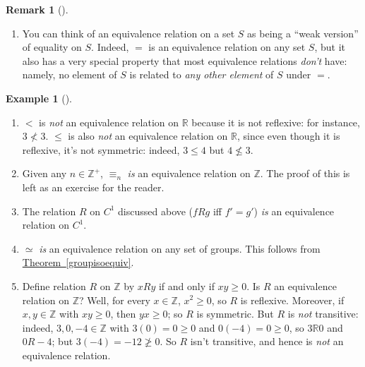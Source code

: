 \documentclass[10pt,]{book}
\theoremstyle{plain}
\theoremstyle{definition}
\theoremstyle{definition}
\newtheorem{remark}[theorem]{Remark}
\theoremstyle{definition}
\newtheorem{example}[theorem]{Example}
\theoremstyle{definition}
\numberwithin{equation}{section}
\def\Z{\mathbb{Z}}
\def\R{\mathbb{R}}
\newcommand{\lt}{ < }
\begin{document}
\begin{remark}[]\label{remark-35}
\leavevmode%
\begin{enumerate}
\item\hypertarget{li-393}{}
          You can think of an
          equivalence relation on a set \(S\) as being a ``weak version'' of
          equality on \(S\).  Indeed, \(=\) is an equivalence relation on any set
          \(S\), but it also has a very special property that most equivalence
          relations \emph{don't} have: namely, no element of \(S\) is related to
          \emph{any other element} of \(S\) under \(=\).
\end{enumerate}
\end{remark}
\begin{example}[]\label{example-67}
\leavevmode%
\begin{enumerate}
\item\hypertarget{li-394}{}
            \(\lt\) is \emph{not} an equivalence relation on \(\R\) because
            it is not reflexive: for instance, \(3\not\lt  3\). \(\leq\) is also \emph{not} an equivalence relation on \(\R\), since even though it is
            reflexive, it's not symmetric: indeed, \(3\leq 4\) but \(4\not\leq 3\).
\item\hypertarget{li-395}{}
            Given any \(n\in \Z^+\), \(\equiv_n\) \emph{is} an equivalence relation on \(\Z\).  The proof of this is left as an exercise for the reader.
\item\hypertarget{li-396}{}
            The relation \(R\) on \(C^1\) discussed above (\(fR  g\) iff \(f'=g'\)) \emph{is} an equivalence relation
            on \(C^1\).
\item\hypertarget{li-397}{}
            \(\simeq\) \emph{is} an equivalence relation on any set of
            groups. This follows from \hyperref[groupisoequiv]{Theorem~\ref{groupisoequiv}}.
\item\hypertarget{li-398}{}
            Define relation \(R\) on \(\Z\) by \(xR y\) if and only if \(xy
            \geq 0\).  Is \(R\) an equivalence relation on \(\Z\)?  Well, for every
            \(x\in \Z\), \(x^2\geq 0\), so \(R\) is reflexive.  Moreover, if \(x,y\in
            \Z\) with \(xy \geq 0\), then \(yx \geq 0\); so \(R\) is symmetric.  But
            \(R\) is \emph{not} transitive: indeed, \(3,0,-4\in \Z\) with \(3(0)=0
            \geq 0\) and \(0(-4)=0\geq 0\), so \(3\R 0\) and \(0 R -4\); but
            \(3(-4)=-12 \not \geq 0\).  So \(R\) isn't transitive, and hence is
            \emph{not} an equivalence relation.
\end{enumerate}
\end{example}
\end{document}
